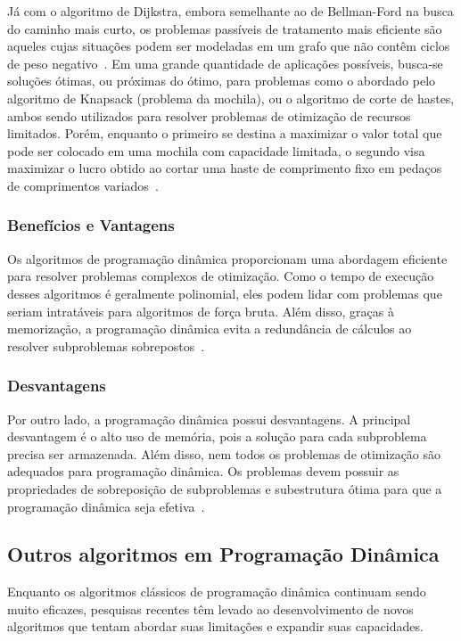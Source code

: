 Já com o algoritmo de Dijkstra, embora semelhante ao de Bellman-Ford na busca do caminho mais curto, os problemas passíveis de tratamento mais eficiente são aqueles cujas situações podem ser modeladas em um grafo que não contêm ciclos de peso negativo~\cite{dijkstra1959note}. Em uma grande quantidade de aplicações possíveis, busca-se soluções ótimas, ou próximas do ótimo, para problemas como o abordado pelo algoritmo de Knapsack (problema da mochila), ou o algoritmo de corte de hastes, ambos sendo utilizados para resolver problemas de otimização de recursos limitados. Porém, enquanto o primeiro se destina a maximizar o valor total que pode ser colocado em uma mochila com capacidade limitada, o segundo visa maximizar o lucro obtido ao cortar uma haste de comprimento fixo em pedaços de comprimentos variados~\cite{CormenLeisersonRivestStein2009}.

\subsubsection{Benefícios e Vantagens}

Os algoritmos de programação dinâmica proporcionam uma abordagem eficiente para resolver problemas complexos de otimização. Como o tempo de execução desses algoritmos é geralmente polinomial, eles podem lidar com problemas que seriam intratáveis para algoritmos de força bruta. Além disso, graças à memorização, a programação dinâmica evita a redundância de cálculos ao resolver subproblemas sobrepostos~\cite{Bellman1957}.

\subsubsection{Desvantagens}

Por outro lado, a programação dinâmica possui desvantagens. A principal desvantagem é o alto uso de memória, pois a solução para cada subproblema precisa ser armazenada. Além disso, nem todos os problemas de otimização são adequados para programação dinâmica. Os problemas devem possuir as propriedades de sobreposição de subproblemas e subestrutura ótima para que a programação dinâmica seja efetiva~\cite{CormenLeisersonRivestStein2009}.

\subsection{Outros algoritmos em Programação Dinâmica}

Enquanto os algoritmos clássicos de programação dinâmica continuam sendo muito eficazes, pesquisas recentes têm levado ao desenvolvimento de novos algoritmos que tentam abordar suas limitações e expandir suas capacidades. 

